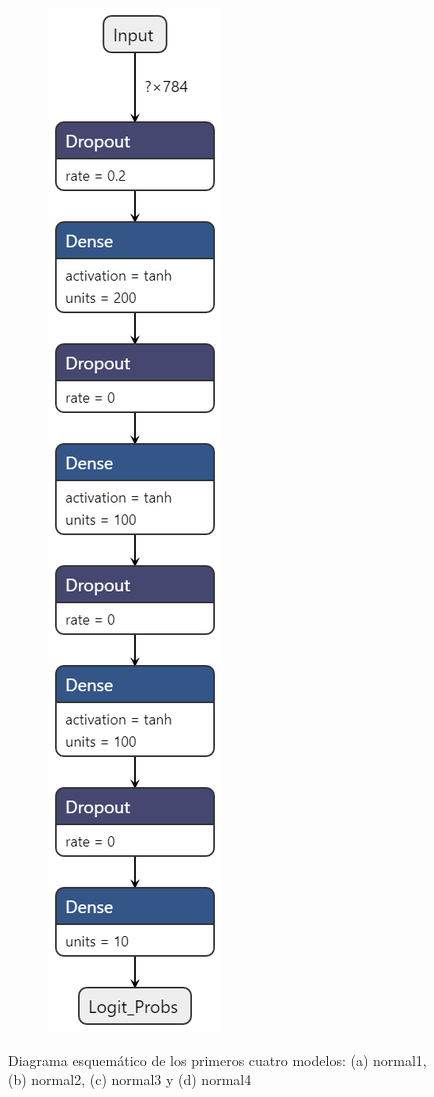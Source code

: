 \documentclass[11pt]{article}
\begin{document}
\begin{figure}[H]
\begin{subfigure}[c]{0.24\textwidth}
        \caption{}
        \label{fig:DNN3}
    \end{subfigure}
    \begin{subfigure}[c]{0.24\textwidth}
        \centering
        \includegraphics[height = 0.95\textheight]{normal4.png}
        \caption{}
        \label{fig:DNN4}
    \end{subfigure}
    \caption{Diagrama esquemático de los primeros cuatro modelos: (a) normal1, (b) normal2, (c) normal3 y (d) normal4}
\end{figure}
\end{document}

